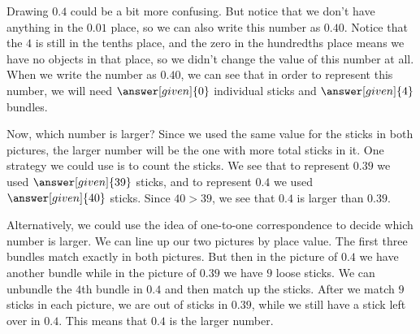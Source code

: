 \documentclass{ximera}
\begin{document}
\begin{question}
\begin{explanation}
\begin{image}
\end{image}

Drawing $0.4$ could be a bit more confusing. But notice that we don't have anything in the $0.01$ place, so we can also write this number as $0.40$. Notice that the $4$ is still in the tenths place, and the zero in the hundredths place means we have no objects in that place, so we didn't change the value of this number at all. When we write the number as $0.40$, we can see that in order to represent this number, we will need $\answer[given]{0}$ individual sticks and $\answer[given]{4}$ bundles.

\begin{image}
\end{image}
Now, which number is larger? Since we used the same value for the sticks in both pictures, the larger number will be the one with more total sticks in it. One strategy we could use is to count the sticks. We see that to represent $0.39$ we used $\answer[given]{39}$ sticks, and to represent $0.4$ we used $\answer[given]{40}$ sticks. Since $40 > 39$, we see that $0.4$ is larger than $0.39$.

Alternatively, we could use the idea of one-to-one correspondence to decide which number is larger. We can line up our two pictures by place value. The first three bundles match exactly in both pictures. But then in the picture of $0.4$ we have another bundle while in the picture of $0.39$ we have $9$ loose sticks. We can unbundle the $4$th bundle in $0.4$ and then match up the sticks. After we match $9$ sticks in each picture, we are out of sticks in $0.39$, while we still have a stick left over in $0.4$. This means that $0.4$ is the larger number.

\end{explanation}
\end{question}
\end{document}
